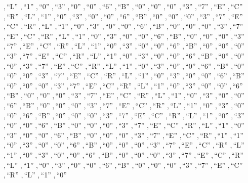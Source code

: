 \documentclass{article}
\makeatletter
\renewcommand{\_}{\rule{.4em}{.06em}\hspace{.05em}}
\renewcommand{\.}[1]{\ensuremath{\mbox{}#1\mbox{}}}
\newcommand{\@w}[1]{\textsf{``{#1}''}}
\makeatother
\begin{document}
{ ,\,\@w{L} ,\,\@w{1} ,\,\@w{0} ,\,\@w{3} ,\,\@w{0} ,\,\@w{0} ,\,\@w{6}
 ,\,\@w{B} ,\,\@w{0} ,\,\@w{0} ,\,\@w{0} ,\,\@w{3} ,\,\@w{7} ,\,\@w{E}
 ,\,\@w{C} ,\,\@w{R} ,\,\@w{L} ,\,\@w{1} ,\,\@w{0} ,\,\@w{3} ,\,\@w{0}
 ,\,\@w{0} ,\,\@w{6} ,\,\@w{B} ,\,\@w{0} ,\,\@w{0} ,\,\@w{0} ,\,\@w{3}
 ,\,\@w{7} ,\,\@w{E} ,\,\@w{C} ,\,\@w{R} ,\,\@w{L} ,\,\@w{1} ,\,\@w{0}
 ,\,\@w{3} ,\,\@w{0} ,\,\@w{0} ,\,\@w{6} ,\,\@w{B} ,\,\@w{0} ,\,\@w{0}
 ,\,\@w{0} ,\,\@w{3} ,\,\@w{7} ,\,\@w{E} ,\,\@w{C} ,\,\@w{R} ,\,\@w{L}
 ,\,\@w{1} ,\,\@w{0} ,\,\@w{3} ,\,\@w{0} ,\,\@w{0} ,\,\@w{6} ,\,\@w{B}
 ,\,\@w{0} ,\,\@w{0} ,\,\@w{0} ,\,\@w{3} ,\,\@w{7} ,\,\@w{E} ,\,\@w{C}
 ,\,\@w{R} ,\,\@w{L} ,\,\@w{1} ,\,\@w{0} ,\,\@w{3} ,\,\@w{0} ,\,\@w{0}
 ,\,\@w{6} ,\,\@w{B} ,\,\@w{0} ,\,\@w{0} ,\,\@w{0} ,\,\@w{3} ,\,\@w{7}
 ,\,\@w{E} ,\,\@w{C} ,\,\@w{R} ,\,\@w{L} ,\,\@w{1} ,\,\@w{0} ,\,\@w{3}
 ,\,\@w{0} ,\,\@w{0} ,\,\@w{6} ,\,\@w{B} ,\,\@w{0} ,\,\@w{0} ,\,\@w{0}
 ,\,\@w{3} ,\,\@w{7} ,\,\@w{E} ,\,\@w{C} ,\,\@w{R} ,\,\@w{L} ,\,\@w{1}
 ,\,\@w{0} ,\,\@w{3} ,\,\@w{0} ,\,\@w{0} ,\,\@w{6} ,\,\@w{B} ,\,\@w{0}
 ,\,\@w{0} ,\,\@w{0} ,\,\@w{3} ,\,\@w{7} ,\,\@w{E} ,\,\@w{C} ,\,\@w{R}
 ,\,\@w{L} ,\,\@w{1} ,\,\@w{0} ,\,\@w{3} ,\,\@w{0} ,\,\@w{0} ,\,\@w{6}
 ,\,\@w{B} ,\,\@w{0} ,\,\@w{0} ,\,\@w{0} ,\,\@w{3} ,\,\@w{7} ,\,\@w{E}
 ,\,\@w{C} ,\,\@w{R} ,\,\@w{L} ,\,\@w{1} ,\,\@w{0} ,\,\@w{3} ,\,\@w{0}
 ,\,\@w{0} ,\,\@w{6} ,\,\@w{B} ,\,\@w{0} ,\,\@w{0} ,\,\@w{0} ,\,\@w{3}
 ,\,\@w{7} ,\,\@w{E} ,\,\@w{C} ,\,\@w{R} ,\,\@w{L} ,\,\@w{1} ,\,\@w{0}
 ,\,\@w{3} ,\,\@w{0} ,\,\@w{0} ,\,\@w{6} ,\,\@w{B} ,\,\@w{0} ,\,\@w{0}
 ,\,\@w{0} ,\,\@w{3} ,\,\@w{7} ,\,\@w{E} ,\,\@w{C} ,\,\@w{R} ,\,\@w{L}
 ,\,\@w{1} ,\,\@w{0} ,\,\@w{3} ,\,\@w{0} ,\,\@w{0} ,\,\@w{6} ,\,\@w{B}
 ,\,\@w{0} ,\,\@w{0} ,\,\@w{0} ,\,\@w{3} ,\,\@w{7} ,\,\@w{E} ,\,\@w{C}
 ,\,\@w{R} ,\,\@w{L} ,\,\@w{1} ,\,\@w{0} ,\,\@w{3} ,\,\@w{0} ,\,\@w{0}
 ,\,\@w{6} ,\,\@w{B} ,\,\@w{0} ,\,\@w{0} ,\,\@w{0} ,\,\@w{3} ,\,\@w{7}
 ,\,\@w{E} ,\,\@w{C} ,\,\@w{R} ,\,\@w{L} ,\,\@w{1} ,\,\@w{0} ,\,\@w{3}
 ,\,\@w{0} ,\,\@w{0} ,\,\@w{6} ,\,\@w{B} ,\,\@w{0} ,\,\@w{0} ,\,\@w{0}
 ,\,\@w{3} ,\,\@w{7} ,\,\@w{E} ,\,\@w{C} ,\,\@w{R} ,\,\@w{1} ,\,\@w{1}
 ,\,\@w{0} ,\,\@w{3} ,\,\@w{0} ,\,\@w{0} ,\,\@w{6} ,\,\@w{B} ,\,\@w{0}
 ,\,\@w{0} ,\,\@w{0} ,\,\@w{3} ,\,\@w{7} ,\,\@w{E} ,\,\@w{C} ,\,\@w{R}
 ,\,\@w{L} ,\,\@w{1} ,\,\@w{0} ,\,\@w{3} ,\,\@w{0} ,\,\@w{0} ,\,\@w{6}
 ,\,\@w{B} ,\,\@w{0} ,\,\@w{0} ,\,\@w{0} ,\,\@w{3} ,\,\@w{7} ,\,\@w{E}
 ,\,\@w{C} ,\,\@w{R} ,\,\@w{L} ,\,\@w{1} ,\,\@w{0} ,\,\@w{3} ,\,\@w{0}
 ,\,\@w{0} ,\,\@w{6} ,\,\@w{B} ,\,\@w{0} ,\,\@w{0} ,\,\@w{0} ,\,\@w{3}
 ,\,\@w{7} ,\,\@w{E} ,\,\@w{C} ,\,\@w{R} ,\,\@w{L} ,\,\@w{1} ,\,\@w{0}
}
\end{document}
